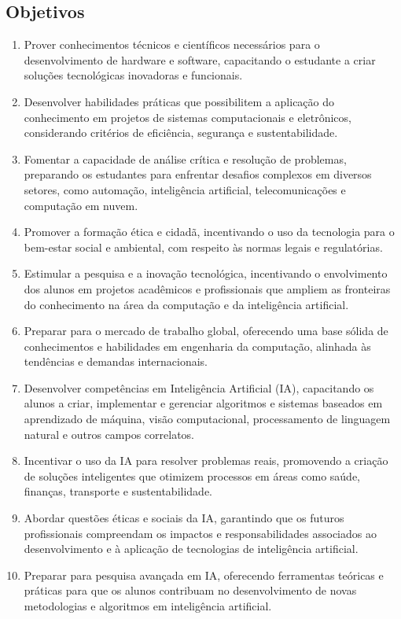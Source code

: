 \subsection{Objetivos}

\begin{enumerate}
    \item Prover conhecimentos técnicos e científicos necessários para o desenvolvimento de hardware e software, capacitando o estudante a criar soluções tecnológicas inovadoras e funcionais.

    \item Desenvolver habilidades práticas que possibilitem a aplicação do conhecimento em projetos de sistemas computacionais e eletrônicos, considerando critérios de eficiência, segurança e sustentabilidade.

    \item Fomentar a capacidade de análise crítica e resolução de problemas, preparando os estudantes para enfrentar desafios complexos em diversos setores, como automação, inteligência artificial, telecomunicações e computação em nuvem.

    \item Promover a formação ética e cidadã, incentivando o uso da tecnologia para o bem-estar social e ambiental, com respeito às normas legais e regulatórias.

    \item Estimular a pesquisa e a inovação tecnológica, incentivando o envolvimento dos alunos em projetos acadêmicos e profissionais que ampliem as fronteiras do conhecimento na área da computação e da inteligência artificial.

    \item Preparar para o mercado de trabalho global, oferecendo uma base sólida de conhecimentos e habilidades em engenharia da computação, alinhada às tendências e demandas internacionais.

    \item Desenvolver competências em Inteligência Artificial (IA), capacitando os alunos a criar, implementar e gerenciar algoritmos e sistemas baseados em aprendizado de máquina, visão computacional, processamento de linguagem natural e outros campos correlatos.

    \item Incentivar o uso da IA para resolver problemas reais, promovendo a criação de soluções inteligentes que otimizem processos em áreas como saúde, finanças, transporte e sustentabilidade.

    \item Abordar questões éticas e sociais da IA, garantindo que os futuros profissionais compreendam os impactos e responsabilidades associados ao desenvolvimento e à aplicação de tecnologias de inteligência artificial.

    \item Preparar para pesquisa avançada em IA, oferecendo ferramentas teóricas e práticas para que os alunos contribuam no desenvolvimento de novas metodologias e algoritmos em inteligência artificial.
\end{enumerate}

